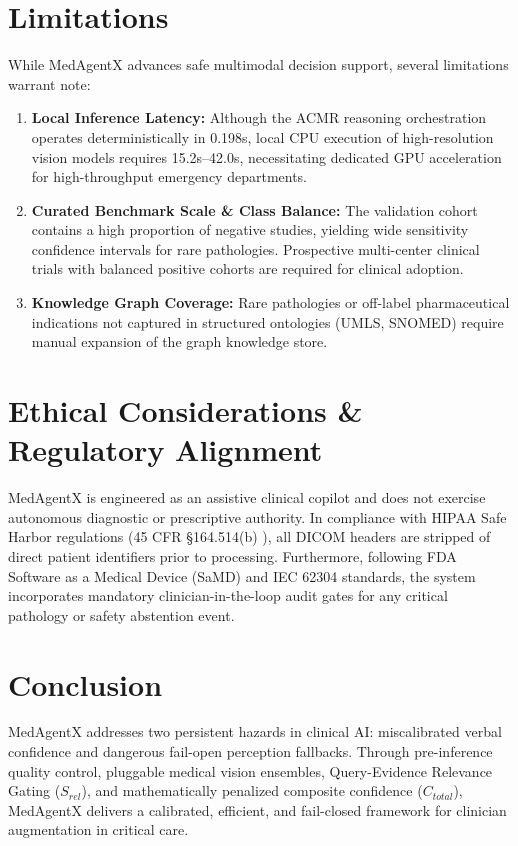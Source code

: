 \documentclass[journal,10pt,twocolumn]{IEEEtran}
\begin{document}
\section{Limitations}
While MedAgentX advances safe multimodal decision support, several limitations warrant note:
\begin{enumerate}
    \item \textbf{Local Inference Latency:} Although the ACMR reasoning orchestration operates deterministically in 0.198s, local CPU execution of high-resolution vision models requires 15.2s--42.0s, necessitating dedicated GPU acceleration for high-throughput emergency departments.
    \item \textbf{Curated Benchmark Scale \& Class Balance:} The validation cohort contains a high proportion of negative studies, yielding wide sensitivity confidence intervals for rare pathologies. Prospective multi-center clinical trials with balanced positive cohorts are required for clinical adoption.
    \item \textbf{Knowledge Graph Coverage:} Rare pathologies or off-label pharmaceutical indications not captured in structured ontologies (UMLS, SNOMED) require manual expansion of the graph knowledge store.
\end{enumerate}

\section{Ethical Considerations \& Regulatory Alignment}
MedAgentX is engineered as an assistive clinical copilot and does not exercise autonomous diagnostic or prescriptive authority. In compliance with HIPAA Safe Harbor regulations (45 CFR \S 164.514(b) \cite{hipaa2002safeharbor}), all DICOM headers are stripped of direct patient identifiers prior to processing. Furthermore, following FDA Software as a Medical Device (SaMD) \cite{fda2017samd} and IEC 62304 \cite{iec62304} standards, the system incorporates mandatory clinician-in-the-loop audit gates for any critical pathology or safety abstention event.

\section{Conclusion}
MedAgentX addresses two persistent hazards in clinical AI: miscalibrated verbal confidence and dangerous fail-open perception fallbacks. Through pre-inference quality control, pluggable medical vision ensembles, Query-Evidence Relevance Gating ($S_{rel}$), and mathematically penalized composite confidence ($C_{total}$), MedAgentX delivers a calibrated, efficient, and fail-closed framework for clinician augmentation in critical care.
\end{document}
